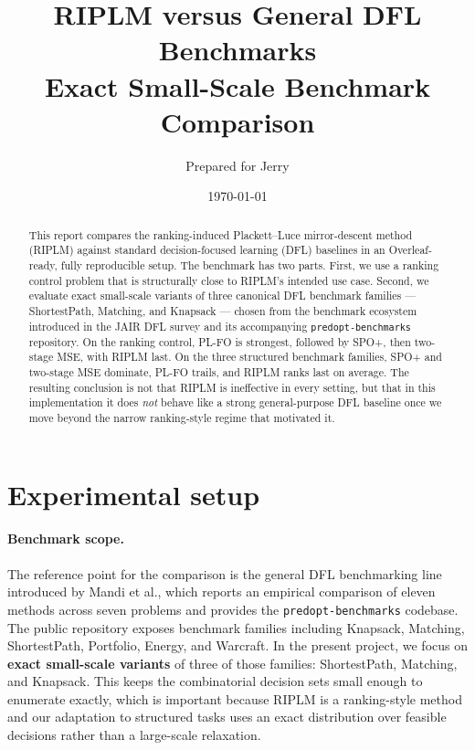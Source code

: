 \documentclass[11pt]{article}
\title{RIPLM versus General DFL Benchmarks\\\large Exact Small-Scale Benchmark Comparison}
\author{Prepared for Jerry}
\date{\today}
\begin{document}
\maketitle

\begin{abstract}
This report compares the ranking-induced Plackett--Luce mirror-descent method (RIPLM) against standard decision-focused learning (DFL) baselines in an Overleaf-ready, fully reproducible setup. The benchmark has two parts. First, we use a ranking control problem that is structurally close to RIPLM's intended use case. Second, we evaluate exact small-scale variants of three canonical DFL benchmark families --- ShortestPath, Matching, and Knapsack --- chosen from the benchmark ecosystem introduced in the JAIR DFL survey and its accompanying \texttt{predopt-benchmarks} repository. On the ranking control, PL-FO is strongest, followed by SPO+, then two-stage MSE, with RIPLM last. On the three structured benchmark families, SPO+ and two-stage MSE dominate, PL-FO trails, and RIPLM ranks last on average. The resulting conclusion is not that RIPLM is ineffective in every setting, but that in this implementation it does \emph{not} behave like a strong general-purpose DFL baseline once we move beyond the narrow ranking-style regime that motivated it.
\end{abstract}

\section{Experimental setup}

\paragraph{Benchmark scope.}
The reference point for the comparison is the general DFL benchmarking line introduced by Mandi et al., which reports an empirical comparison of eleven methods across seven problems and provides the \texttt{predopt-benchmarks} codebase. The public repository exposes benchmark families including Knapsack, Matching, ShortestPath, Portfolio, Energy, and Warcraft. In the present project, we focus on \textbf{exact small-scale variants} of three of those families: ShortestPath, Matching, and Knapsack. This keeps the combinatorial decision sets small enough to enumerate exactly, which is important because RIPLM is a ranking-style method and our adaptation to structured tasks uses an exact distribution over feasible decisions rather than a large-scale relaxation.\cite{mandi2024jair,predoptbenchmark}
\end{document}
